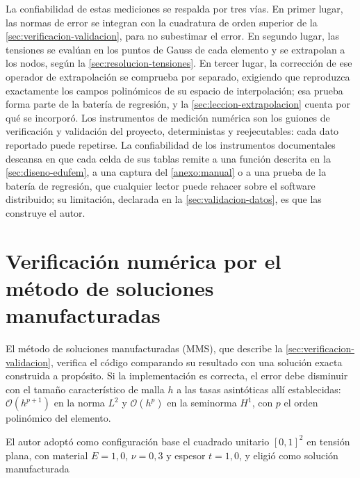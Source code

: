 La confiabilidad de estas mediciones se respalda por tres vías. En primer lugar, las normas de error se integran con la cuadratura de orden superior de la \autoref{sec:verificacion-validacion}, para no subestimar el error. En segundo lugar, las tensiones se evalúan en los puntos de Gauss de cada elemento y se extrapolan a los nodos, según la \autoref{sec:resolucion-tensiones}. En tercer lugar, la corrección de ese operador de extrapolación se comprueba por separado, exigiendo que reproduzca exactamente los campos polinómicos de su espacio de interpolación; esa prueba forma parte de la batería de regresión, y la \autoref{sec:leccion-extrapolacion} cuenta por qué se incorporó. Los instrumentos de medición numérica son los guiones de verificación y validación del proyecto, deterministas y reejecutables: cada dato reportado puede repetirse. La confiabilidad de los instrumentos documentales descansa en que cada celda de sus tablas remite a una función descrita en la \autoref{sec:diseno-edufem}, a una captura del \autoref{anexo:manual} o a una prueba de la batería de regresión, que cualquier lector puede rehacer sobre el software distribuido; su limitación, declarada en la \autoref{sec:validacion-datos}, es que las construye el autor.

\section{Verificación numérica por el método de soluciones manufacturadas}
\label{sec:mms}

El método de soluciones manufacturadas (MMS), que describe la \autoref{sec:verificacion-validacion}, verifica el código comparando su resultado con una solución exacta construida a propósito. Si la implementación es correcta, el error debe disminuir con el tamaño característico de malla $h$ a las tasas asintóticas allí establecidas: $\mathcal{O}(h^{p+1})$ en la norma $L^2$ y $\mathcal{O}(h^{p})$ en la seminorma $H^1$, con $p$ el orden polinómico del elemento.

El autor adoptó como configuración base el cuadrado unitario $[0,1]^2$ en tensión plana, con material $E = 1{,}0$, $\nu = 0{,}3$ y espesor $t = 1{,}0$, y eligió como solución manufacturada

